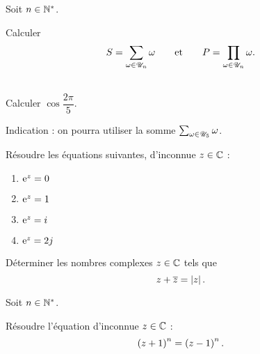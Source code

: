 \begin{corr}
\end{corr}

\begin{exo}
Soit \(n\in\mathbb{N}^*\).

Calculer \[S=\sum_{\omega\in\mathscr{U}_n}\omega\qquad\text{et}\qquad P=\prod_{\omega\in\mathscr{U}_n}\omega.\]
\end{exo}

\begin{corr}
\end{corr}

\begin{exo}~\\
Calculer \(\cos\dfrac{2\pi}{5}\).

Indication : on pourra utiliser la somme \(\sum_{\omega\in\mathscr{U}_5}\omega\).
\end{exo}

\begin{corr}
\end{corr}

\begin{exo}
Résoudre les équations suivantes, d'inconnue \(z\in\mathbb{C}\) :

\begin{enumerate}
\item \(\mathrm{e}^{z}=0\) \\

\item \(\mathrm{e}^{z}=1\) \\

\item \(\mathrm{e}^{z}=i\mkern1mu\) \\

\item \(\mathrm{e}^{z}=2j\)
\end{enumerate}
\end{exo}

\begin{corr}
\end{corr}

\begin{exo}
Déterminer les nombres complexes \(z\in\mathbb{C}\) tels que \[z+\overline{z}=\left\lvert z\right\rvert.\]
\end{exo}

\begin{corr}
\end{corr}

\begin{exo}
Soit \(n\in\mathbb{N}^*\).

Résoudre l'équation d'inconnue \(z\in\mathbb{C}\) : \[\left(z+1\right)^n=\left(z-1\right)^n.\]
\end{exo}

